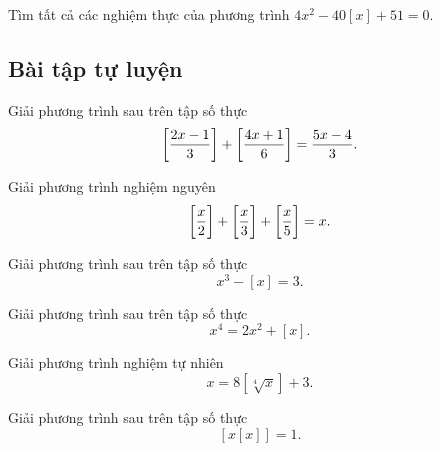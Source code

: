 \begin{bx}
Tìm tất cả các nghiệm thực của phương trình
$4{x^2} - 40\left[ x \right]  + 51 = 0$.
\end{bx}

\subsection*{Bài tập tự luyện}

\begin{btt}
Giải phương trình sau trên tập số thực
$$\left[ \dfrac{{2x - 1}}{3} \right]+ \left[ \dfrac{{4x + 1}}{6} \right] = \dfrac{{5x - 4}}{3}.$$
\end{btt}

\begin{btt}
Giải phương trình nghiệm nguyên
	$$\displaystyle\bigg[ {\dfrac{x}{2}} \bigg]  + \bigg[ {\dfrac{x}{3}} \bigg]  + \bigg[ {\dfrac{x}{5}} \bigg]  = x.$$
\end{btt}

\begin{btt}
Giải phương trình sau trên tập số thực
\[x^3-\left[ x\right]=3.\]
\end{btt}

\begin{btt}
Giải phương trình sau trên tập số thực \[x^4=2x^2+\left[x\right].\]
\end{btt}

\begin{btt}
Giải phương trình nghiệm tự nhiên $$x=8\left[\sqrt[4]{x}\right]+3.$$
\end{btt}

\begin{btt}
Giải phương trình sau trên tập số thực
\[\left[ x\left[ x\right]\right]=1.\]
\end{btt}


